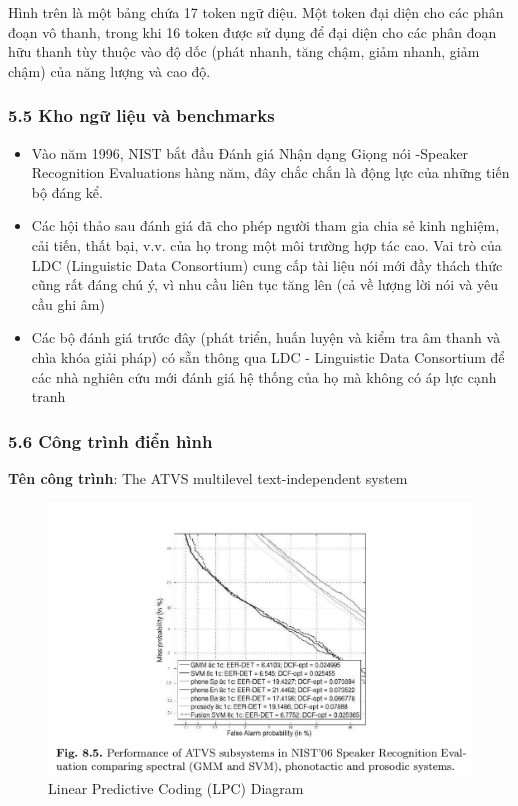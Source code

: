 \documentclass{article}
\begin{document}
	Hình trên là một bảng chứa 17 token ngữ điệu. Một token đại diện cho các phân đoạn vô thanh, trong khi 16 token được sử dụng để đại diện cho các phân đoạn hữu thanh tùy thuộc vào độ dốc (phát nhanh, tăng chậm, giảm nhanh, giảm chậm) của năng lượng và cao độ.
	
	\subsubsection{5.5 Kho ngữ liệu và benchmarks}
	\begin{itemize}
		\item Vào năm 1996, NIST bắt đầu Đánh giá Nhận dạng Giọng nói -Speaker Recognition Evaluations hàng năm, đây chắc chắn là động lực của những tiến bộ đáng kể.
		\item Các hội thảo sau đánh giá đã cho phép người tham gia chia sẻ kinh nghiệm, cải tiến, thất bại, v.v. của họ trong một môi trường hợp tác cao. Vai trò của LDC (Linguistic Data Consortium) cung cấp tài liệu nói mới đầy thách thức cũng rất đáng chú ý, vì nhu cầu liên tục tăng lên (cả về lượng lời nói và yêu cầu ghi âm)
		\item Các bộ đánh giá trước đây (phát triển, huấn luyện và kiểm tra âm thanh và chìa khóa giải pháp) có sẵn thông qua LDC - Linguistic Data Consortium để các nhà nghiên cứu mới đánh giá hệ thống của họ mà không có áp lực cạnh tranh
	\end{itemize}
	
	\subsubsection{5.6 Công trình điển hình}
	\textbf{Tên công trình}: The ATVS multilevel text-independent system
	\begin{figure}[H]
		\centering
		\includegraphics[width=1\linewidth]{images/figure_8_5.png}
		\caption{Linear Predictive Coding (LPC) Diagram}
		\label{fig:writing-thesis}
	\end{figure}
\end{document}
